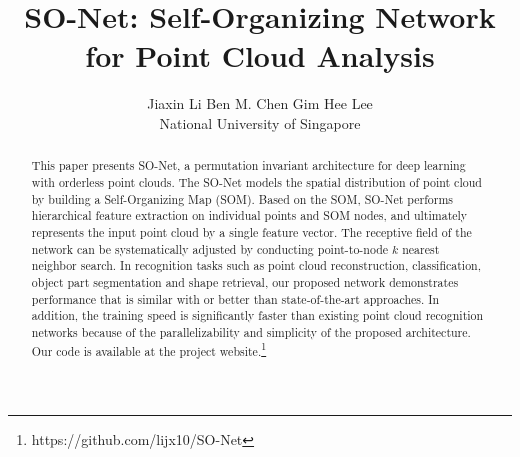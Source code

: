 \documentclass[10pt,twocolumn,letterpaper]{article}
\begin{document}
\title{SO-Net: Self-Organizing Network for Point Cloud Analysis}

\author{Jiaxin Li \qquad Ben M. Chen \qquad Gim Hee Lee \\
National University of Singapore
}

\maketitle



\begin{abstract}
This paper presents SO-Net, a permutation invariant architecture for deep learning with orderless point clouds. The SO-Net models the spatial distribution of point cloud by building a Self-Organizing Map (SOM). Based on the SOM, SO-Net performs hierarchical feature extraction on individual points and SOM nodes, and ultimately represents the input point cloud by a single feature vector. The receptive field of the network can be systematically adjusted by conducting point-to-node $k$ nearest neighbor search. In recognition tasks such as point cloud reconstruction, classification, object part segmentation and shape retrieval, our proposed network demonstrates performance that is similar with or better than state-of-the-art approaches. In addition, the training speed is significantly faster than existing point cloud recognition networks because of the parallelizability and simplicity of the proposed architecture. Our code is available at the project website.\footnote{https://github.com/lijx10/SO-Net}

\end{abstract}
%
%
\end{document}
